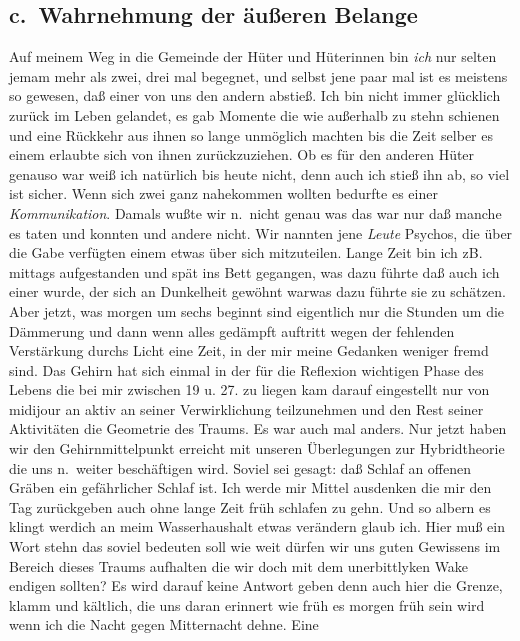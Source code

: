 \documentclass[
]{article}
\author{}
\date{\vspace{-2.5em}}
\begin{document}
\subsection{c.~Wahrnehmung der äußeren
Belange}\label{c.-wahrnehmung-der-uxe4uuxdferen-belange}

Auf meinem Weg in die Gemeinde der Hüter und Hüterinnen bin \emph{ich}
nur selten jemam mehr als zwei, drei mal begegnet, und selbst jene paar
mal ist es meistens so gewesen, daß einer von uns den andern abstieß.
Ich bin nicht immer glücklich zurück im Leben gelandet, es gab Momente
die wie außerhalb zu stehn schienen und eine Rückkehr aus ihnen so lange
unmöglich machten bis die Zeit selber es einem erlaubte sich von ihnen
zurückzuziehen. Ob es für den anderen Hüter genauso war weiß ich
natürlich bis heute nicht, denn auch ich stieß ihn ab, so viel ist
sicher. Wenn sich zwei ganz nahekommen wollten bedurfte es einer
\emph{Kommunikation}. Damals wußte wir n.~nicht genau was das war nur
daß manche es taten und konnten und andere nicht. Wir nannten jene
\emph{Leute} Psychos, die über die Gabe verfügten einem etwas über sich
mitzuteilen. Lange Zeit bin ich zB. mittags aufgestanden und spät ins
Bett gegangen, was dazu führte daß auch ich einer wurde, der sich an
Dunkelheit gewöhnt warwas dazu führte sie zu schätzen. Aber jetzt, was
morgen um sechs beginnt sind eigentlich nur die Stunden um die Dämmerung
und dann wenn alles gedämpft auftritt wegen der fehlenden Verstärkung
durchs Licht eine Zeit, in der mir meine Gedanken weniger fremd sind.
Das Gehirn hat sich einmal in der für die Reflexion wichtigen Phase des
Lebens die bei mir zwischen 19 u. 27. zu liegen kam darauf eingestellt
nur von midijour an aktiv an seiner Verwirklichung teilzunehmen und den
Rest seiner Aktivitäten die Geometrie des Traums. Es war auch mal
anders. Nur jetzt haben wir den Gehirnmittelpunkt erreicht mit unseren
Überlegungen zur Hybridtheorie die uns n.~weiter beschäftigen wird.
Soviel sei gesagt: daß Schlaf an offenen Gräben ein gefährlicher Schlaf
ist. Ich werde mir Mittel ausdenken die mir den Tag zurückgeben auch
ohne lange Zeit früh schlafen zu gehn. Und so albern es klingt werdich
an meim Wasserhaushalt etwas verändern glaub ich. Hier muß ein Wort
stehn das soviel bedeuten soll wie weit dürfen wir uns guten Gewissens
im Bereich dieses Traums aufhalten die wir doch mit dem unerbittlyken
Wake endigen sollten? Es wird darauf keine Antwort geben denn auch hier
die Grenze, klamm und kältlich, die uns daran erinnert wie früh es
morgen früh sein wird wenn ich die Nacht gegen Mitternacht dehne. Eine
\end{document}
